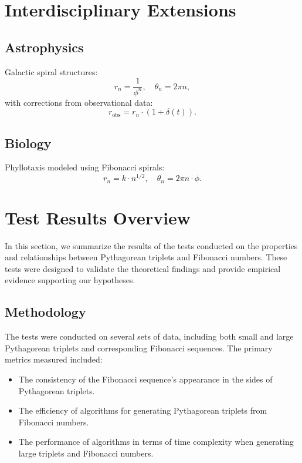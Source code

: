 \documentclass[11pt]{article}
\begin{document}
\section{Interdisciplinary Extensions}
\subsection{Astrophysics}
Galactic spiral structures:
\begin{equation}
    r_n = \frac{1}{\phi^n}, \quad \theta_n = 2\pi n,
\end{equation}
with corrections from observational data:
\begin{equation}
    r_{\text{obs}} = r_n \cdot (1 + \delta(t)).
\end{equation}
\subsection{Biology}
Phyllotaxis modeled using Fibonacci spirals:
\begin{equation}
    r_n = k \cdot n^{1/2}, \quad \theta_n = 2\pi n \cdot \phi.
\end{equation}
\section{Test Results Overview}

In this section, we summarize the results of the tests conducted on the properties and relationships between Pythagorean triplets and Fibonacci numbers. These tests were designed to validate the theoretical findings and provide empirical evidence supporting our hypotheses.

\subsection{Methodology}
The tests were conducted on several sets of data, including both small and large Pythagorean triplets and corresponding Fibonacci sequences. The primary metrics measured included:

\begin{itemize}
    \item The consistency of the Fibonacci sequence's appearance in the sides of Pythagorean triplets.
    \item The efficiency of algorithms for generating Pythagorean triplets from Fibonacci numbers.
    \item The performance of algorithms in terms of time complexity when generating large triplets and Fibonacci numbers.
\end{itemize}
\end{document}

